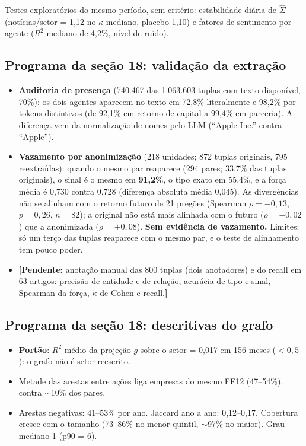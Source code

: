 \documentclass[11pt,a4paper]{article}
\newcommand{\Sig}{\hat\Sigma}
\newcommand{\pend}[1]{\textcolor{red!70!black}{\textbf{[Pendente:} #1\textbf{]}}}
\begin{document}
Testes exploratórios do mesmo período, sem critério: estabilidade diária de $\Sig$ (notícias/setor =
1,12 no $\kappa$ mediano, placebo 1,10) e fatores de sentimento por agente ($R^2$ mediano de 4,2\%, nível
de ruído).

\subsection{Programa da seção 18: validação da extração}

\begin{itemize}
  \item \textbf{Auditoria de presença} (740.467 das 1.063.603 tuplas com texto disponível, 70\%): os
        dois agentes aparecem no texto em 72,8\% literalmente e 98,2\% por tokens distintivos (de 92,1\%
        em retorno de capital a 99,4\% em parceria). A diferença vem da normalização de nomes pelo LLM
        (``Apple Inc.'' contra ``Apple'').
  \item \textbf{Vazamento por anonimização} (218 unidades; 872 tuplas originais, 795 reextraídas): quando o
        mesmo par reaparece (294 pares; 33,7\% das tuplas originais), o sinal é o mesmo em
        \textbf{91,2\%}, o tipo exato em 55,4\%, e a força média é 0,730 contra 0,728 (diferença absoluta
        média 0,045). As divergências não se alinham com o retorno futuro de 21 pregões
        (Spearman $\rho=-0{,}13$, $p=0{,}26$, $n=82$); a original não está mais alinhada com o futuro
        ($\rho=-0{,}02$) que a anonimizada ($\rho=+0{,}08$). \textbf{Sem evidência de vazamento.} Limites:
        só um terço das tuplas reaparece com o mesmo par, e o teste de alinhamento tem pouco poder.
  \item \pend{anotação manual das 800 tuplas (dois anotadores) e do recall em 63 artigos: precisão de
        entidade e de relação, acurácia de tipo e sinal, Spearman da força, $\kappa$ de Cohen e recall.}
\end{itemize}

\subsection{Programa da seção 18: descritivas do grafo}

\begin{itemize}
  \item \textbf{Portão}: $R^2$ médio da projeção $g$ sobre o setor = 0,017 em 156 meses ($<0{,}5$): o grafo
        não é setor reescrito.
  \item Metade das arestas entre ações liga empresas do mesmo FF12 (47--54\%), contra $\sim$10\% dos pares.
  \item Arestas negativas: 41--53\% por ano. Jaccard ano a ano: 0,12--0,17. Cobertura cresce com o
        tamanho (73--86\% no menor quintil, $\sim$97\% no maior). Grau mediano 1 (p90 = 6).
\end{itemize}
\end{document}
